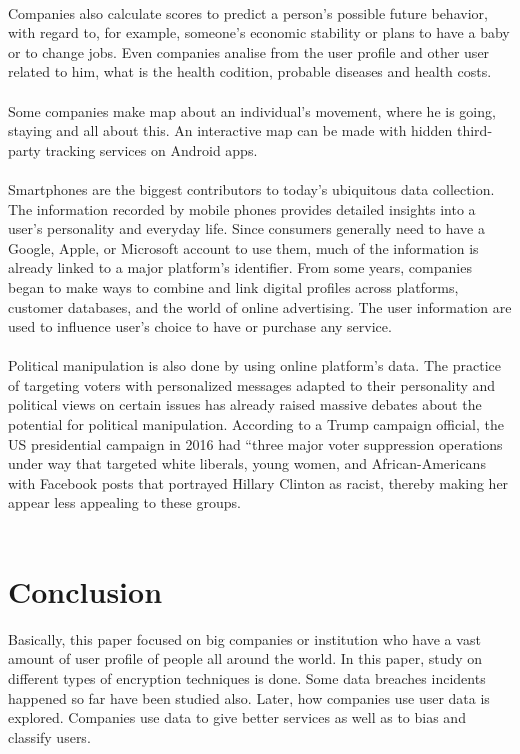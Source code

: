 \documentclass[12pt,a4paper,conference]{IEEEtran}
\begin{document}
\\
Companies also calculate scores to predict a person’s possible future behavior, with regard to, for example, someone’s economic stability or plans to have a baby or to change jobs. Even companies analise from the user profile and other user related to him, what is the health codition, probable diseases and health costs. \\
\\
Some companies make map about an individual’s movement, where he is going, staying and all about this. An interactive map can be made with hidden third-party tracking services on Android apps. \\
\\
Smartphones are the biggest contributors to today’s ubiquitous data collection. The information recorded by mobile phones provides detailed insights into a user’s personality and everyday life. Since consumers generally need to have a Google, Apple, or Microsoft account to use them, much of the information is already linked to a major platform’s identifier. From some years, companies began to make ways to combine and link digital profiles across platforms, customer databases, and the world of online advertising. The user information are used to influence user’s choice to have or purchase any service.\\
\\
Political manipulation is also done by using online platform’s data. The practice of targeting voters with personalized messages adapted to their personality and political views on certain issues has already raised massive debates about the potential for political manipulation. According to a Trump campaign official, the US presidential campaign in 2016 had “three major voter suppression operations under way that targeted white liberals, young women, and African-Americans with Facebook posts that portrayed Hillary Clinton as racist\autocite{halpern2017he}, thereby making her appear less appealing to these groups. \\
\\
\section{Conclusion}
Basically, this paper focused on big companies or institution who have a vast amount of user profile of people all around the world. In this paper, study on different types of encryption techniques is done. Some data breaches incidents happened so far have been studied also. Later, how companies use user data is explored. Companies use data to give better services as well as to bias and classify users.\\


\printbibliography
\end{document}
